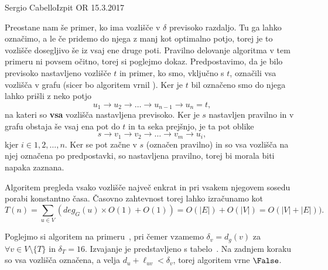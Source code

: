 \begin{naloga}{Sergio Cabello}{Izpit OR 15.3.2017}
\begin{odgovor}
Preostane nam še primer, ko ima vozlišče v $\delta$ previsoko razdaljo.
Tu ga lahko označimo, a le če pridemo do njega z manj kot optimalno potjo, 
torej je to vozlišče dosegljivo še iz vsaj ene druge poti.
Pravilno delovanje algoritma v tem primeru ni povsem očitno, torej si poglejmo dokaz.
Predpostavimo, da je bilo previsoko nastavljeno vozlišče $t$ in primer, ko smo, vključno s $t$,
označili vsa vozlišča v grafu (sicer bo algoritem vrnil \False).
Ker je $t$ bil označeno smo do njega lahko prišli z neko potjo 
$$u_1 \rightarrow u_2 \rightarrow \dots \rightarrow u_{n-1} \rightarrow u_n = t,$$
na kateri so {\bf vsa} vozlišča nastavljena previsoko.
Ker je $s$ nastavljen pravilno in v grafu obstaja še vsaj ena pot do $t$ in ta seka prejšnjo, je ta pot oblike
$$s \rightarrow v_1 \rightarrow v_2 \rightarrow \dots \rightarrow v_m \rightarrow u_i,$$
kjer $i \in {1, 2, \dots, n}$.
Ker se pot začne v $s$ (označen pravilno) in so vsa vozlišča na njej označena po predpostavki, so nastavljena pravilno,
torej bi morala biti napaka zaznana.\bigskip

Algoritem pregleda vsako vozlišče največ enkrat in pri vsakem njegovem sosedu porabi konstantno časa.
Časovno zahtevnost torej lahko izračunamo kot 
$$T(n)  = \sum_{u \in V}\left(deg_G(u) \times O(1) + O(1)\right) = O(|E|) + O(|V|) = O(|V| + |E|)).$$
\bigskip

Poglejmo si algoritem na primeru~\fig, pri čemer vzamemo $\delta_v = d_g(v)$ za $ \forall v \in V \setminus \{T\}$ in $\delta_T = 16$.
Izvajanje je predstavljeno s tabelo~\tab.
Na zadnjem koraku so vsa vozlišča označena, a velja $d_u + \ell_{uv} < \delta_v$, torej algoritem vrne $\False$.
\begin{slika}
\pgfslika
{}
\end{slika}
\begin{tabela}
\end{tabela}

\end{odgovor}
\end{naloga}

